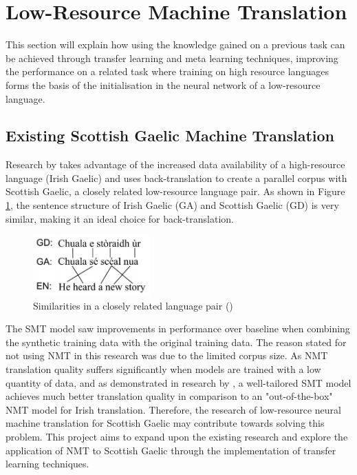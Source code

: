 \section{Low-Resource Machine Translation}
\label{sec:2-low_resource_approaches}
This section will explain how using the knowledge gained on a previous task can be achieved through transfer learning and meta learning techniques, improving the performance on a related task where training on high resource languages forms the basis of the initialisation in the neural network of a low-resource language.

\subsection{Existing Scottish Gaelic Machine Translation}

Research by \cite{dowling_leveraging_2019} takes advantage of the increased data availability of a high-resource language (Irish Gaelic) and uses back-translation to create a parallel corpus with Scottish Gaelic, a closely related low-resource language pair. As shown in Figure \ref{fig:lang_pair}, the sentence structure of Irish Gaelic (GA) and Scottish Gaelic (GD) is very similar, making it an ideal choice for back-translation.

\begin{figure}[ht!]
\centering
\includegraphics[width=0.4\textwidth]{media/literature/nmt_approaches/lr_gaelic.png}
\caption[Similarities in a closely related language pair]{Similarities in a closely related language pair (\cite{dowling_leveraging_2019})}
\label{fig:lang_pair}
\end{figure}


The \acrshort{SMT} model saw improvements in performance over baseline when combining the synthetic training data with the original training data. The reason stated for not using \acrshort{NMT} in this research was due to the limited corpus size. As \acrshort{NMT} translation quality suffers significantly when models are trained with a low quantity of data, and as demonstrated in research by \cite{dowling_smt_2018}, a well-tailored \acrshort{SMT} model achieves much better translation quality in comparison to an "out-of-the-box" \acrshort{NMT} model for Irish translation. Therefore, the research of low-resource neural machine translation for Scottish Gaelic may contribute towards solving this problem. This project aims to expand upon the existing research and explore the application of \acrshort{NMT} to Scottish Gaelic through the implementation of transfer learning techniques.

